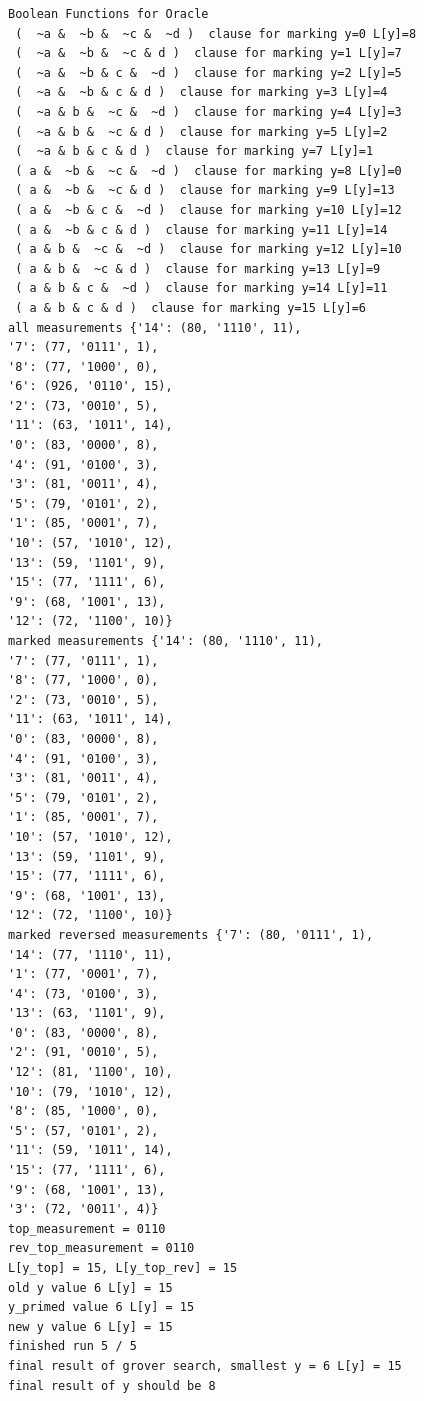 \documentclass[11pt]{article}
\begin{document}
\begin{verbatim}
Boolean Functions for Oracle
 (  ~a &  ~b &  ~c &  ~d )  clause for marking y=0 L[y]=8
 (  ~a &  ~b &  ~c & d )  clause for marking y=1 L[y]=7
 (  ~a &  ~b & c &  ~d )  clause for marking y=2 L[y]=5
 (  ~a &  ~b & c & d )  clause for marking y=3 L[y]=4
 (  ~a & b &  ~c &  ~d )  clause for marking y=4 L[y]=3
 (  ~a & b &  ~c & d )  clause for marking y=5 L[y]=2
 (  ~a & b & c & d )  clause for marking y=7 L[y]=1
 ( a &  ~b &  ~c &  ~d )  clause for marking y=8 L[y]=0
 ( a &  ~b &  ~c & d )  clause for marking y=9 L[y]=13
 ( a &  ~b & c &  ~d )  clause for marking y=10 L[y]=12
 ( a &  ~b & c & d )  clause for marking y=11 L[y]=14
 ( a & b &  ~c &  ~d )  clause for marking y=12 L[y]=10
 ( a & b &  ~c & d )  clause for marking y=13 L[y]=9
 ( a & b & c &  ~d )  clause for marking y=14 L[y]=11
 ( a & b & c & d )  clause for marking y=15 L[y]=6
all measurements {'14': (80, '1110', 11), 
'7': (77, '0111', 1), 
'8': (77, '1000', 0), 
'6': (926, '0110', 15), 
'2': (73, '0010', 5), 
'11': (63, '1011', 14), 
'0': (83, '0000', 8), 
'4': (91, '0100', 3), 
'3': (81, '0011', 4), 
'5': (79, '0101', 2), 
'1': (85, '0001', 7), 
'10': (57, '1010', 12), 
'13': (59, '1101', 9), 
'15': (77, '1111', 6), 
'9': (68, '1001', 13), 
'12': (72, '1100', 10)}
marked measurements {'14': (80, '1110', 11), 
'7': (77, '0111', 1), 
'8': (77, '1000', 0), 
'2': (73, '0010', 5), 
'11': (63, '1011', 14), 
'0': (83, '0000', 8), 
'4': (91, '0100', 3), 
'3': (81, '0011', 4), 
'5': (79, '0101', 2), 
'1': (85, '0001', 7), 
'10': (57, '1010', 12), 
'13': (59, '1101', 9), 
'15': (77, '1111', 6), 
'9': (68, '1001', 13), 
'12': (72, '1100', 10)}
marked reversed measurements {'7': (80, '0111', 1), 
'14': (77, '1110', 11), 
'1': (77, '0001', 7), 
'4': (73, '0100', 3), 
'13': (63, '1101', 9), 
'0': (83, '0000', 8), 
'2': (91, '0010', 5), 
'12': (81, '1100', 10), 
'10': (79, '1010', 12), 
'8': (85, '1000', 0), 
'5': (57, '0101', 2), 
'11': (59, '1011', 14), 
'15': (77, '1111', 6), 
'9': (68, '1001', 13), 
'3': (72, '0011', 4)}
top_measurement = 0110
rev_top_measurement = 0110
L[y_top] = 15, L[y_top_rev] = 15
old y value 6 L[y] = 15
y_primed value 6 L[y] = 15
new y value 6 L[y] = 15
finished run 5 / 5
final result of grover search, smallest y = 6 L[y] = 15
final result of y should be 8
\end{verbatim}
\end{document}
